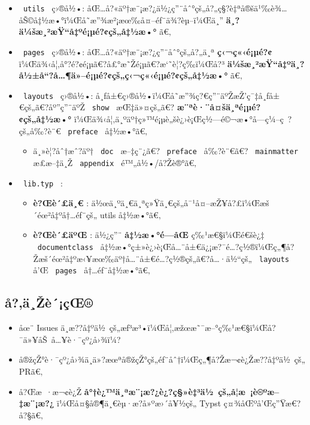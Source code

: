 \begin{itemize}
\tightlist
\item
  \texttt{\ utils\ } ç›®å½•:
  åŒ\ldots å?«äº†æ¨¡æ?¿ä½¿ç''¨åˆ°çš„å?„ç§?è‡ªå®šä¹‰è¾\ldots åŠ©å‡½æ•°ï¼Œå­˜æ''¾æ²¡æœ‰å¤--éƒ¨ä¾?èµ--ï¼Œä¸''
  \textbf{ä¸?ä¼šæ¸²æŸ``å‡ºé¡µé?¢çš„å‡½æ•°} ã€‚
\item
  \texttt{\ pages\ } ç›®å½•: åŒ\ldots å?«äº†æ¨¡æ?¿ç''¨åˆ°çš„å?„ä¸ª
  \textbf{ç‹¬ç«‹é¡µé?¢} ï¼Œä¾‹å¦‚å°?é?¢é¡µã€?å£°æ˜Žé¡µã€?æ`˜è¦?ç­‰ï¼Œå?³
  \textbf{ä¼šæ¸²æŸ``å‡ºä¸?å½±å``?å\ldots¶ä»--é¡µé?¢çš„ç‹¬ç«‹é¡µé?¢çš„å‡½æ•°}
  ã€‚
\item
  \texttt{\ layouts\ } ç›®å½•:
  å¸ƒå±€ç›®å½•ï¼Œå­˜æ''¾ç?€ç''¨äºŽæŽ'ç¯‡å¸ƒå±€çš„ã€?åº''ç''¨äºŽ
  \texttt{\ show\ } æŒ‡ä»¤çš„ã€? \textbf{æ¨ªè·¨å¤šä¸ªé¡µé?¢çš„å‡½æ•°}
  ï¼Œä¾‹å¦‚ä¸ºäº†ç»™é¡µè„šè¿›è¡Œç½---é©¬æ•°å­---ç¼--ç~?çš„å‰?è¨€
  \texttt{\ preface\ } å‡½æ•°ã€‚

  \begin{itemize}
  \tightlist
  \item
    ä¸»è¦?åˆ†æˆ?äº† \texttt{\ doc\ } æ--‡ç¨¿ã€? \texttt{\ preface\ }
    å‰?è¨€ã€? \texttt{\ mainmatter\ } æ­£æ--‡ä¸Ž \texttt{\ appendix\ }
    é™„å½•/å?Žè®°ã€‚
  \end{itemize}
\item
  \texttt{\ lib.typ\ } :

  \begin{itemize}
  \tightlist
  \item
    \textbf{è?Œè´£ä¸€} :
    ä½œä¸ºä¸€ä¸ªç»Ÿä¸€çš„å¯¹å¤--æŽ¥å?£ï¼Œæš´éœ²å‡ºå†\ldots éƒ¨çš„ utils
    å‡½æ•°ã€‚
  \item
    \textbf{è?Œè´£äºŒ} : ä½¿ç''¨ \textbf{å‡½æ•°é---­åŒ} ç‰¹æ€§ï¼Œé€šè¿‡
    \texttt{\ documentclass\ }
    å‡½æ•°ç±»è¿›è¡Œå\ldots¨å±€ä¿¡æ?¯é\ldots?ç½®ï¼Œç„¶å?Žæš´éœ²å‡ºæ‹¥æœ‰äº†å\ldots¨å±€é\ldots?ç½®çš„ã€?å\ldots·ä½``çš„
    \texttt{\ layouts\ } å'Œ \texttt{\ pages\ } å†\ldots éƒ¨å‡½æ•°ã€‚
  \end{itemize}
\end{itemize}

\subsection{å?‚ä¸Žè´¡çŒ®}\label{uxe5uxe4ux17euxe8uxe7ux153}

\begin{itemize}
\tightlist
\item
  åœ¨ Issues
  ä¸­æ??å‡ºä½~çš„æƒ³æ³•ï¼Œå¦‚æžœæ˜¯æ--°ç‰¹æ€§ï¼Œå?¯ä»¥åŠ~å\ldots¥è·¯çº¿å›¾ï¼?
\item
  å®žçŽ°è·¯çº¿å›¾ä¸­ä»?æœªå®žçŽ°çš„éƒ¨åˆ†ï¼Œç„¶å?Žæ¬¢è¿Žæ??å‡ºä½~çš„
  PRã€‚
\item
  å?Œæ~·æ¬¢è¿Ž \textbf{å°†è¿™ä¸ªæ¨¡æ?¿è¿?ç§»è‡³ä½~çš„å­¦æ~¡è®ºæ--‡æ¨¡æ?¿}
  ï¼Œå¤§å®¶ä¸€èµ·æ?­å»ºæ›´å¥½çš„ Typst ç¤¾åŒºå'Œç''Ÿæ€?å?§ã€‚
\end{itemize}

